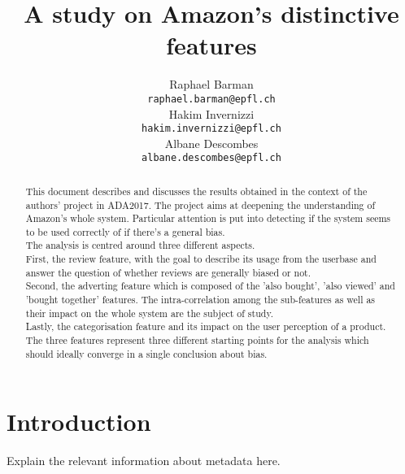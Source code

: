 \documentclass[11pt]{article}
\title{A study on Amazon's distinctive features}
\author{Raphael Barman \\
  {\tt raphael.barman@epfl.ch} \\\And
  Hakim Invernizzi \\
  {\tt hakim.invernizzi@epfl.ch} \\\And
Albane Descombes \\
{\tt albane.descombes@epfl.ch} \\}
\date{}
\begin{document}
\maketitle
\begin{abstract}
  This document describes and discusses the results obtained in the context of the authors' project in ADA2017. The project aims at deepening the understanding 
  of Amazon's whole system. Particular attention is put into detecting if the system seems to be used correctly of if there's a general bias. \\
  The analysis is centred around three different aspects. \\ First, the review feature, with the goal to describe its usage from the userbase and answer the question of whether reviews are generally biased or not. \\ Second, the adverting feature which is composed of the 'also bought', 'also viewed' and 'bought together' features. The intra-correlation among the sub-features as well as their impact on the whole system are the subject of study. \\ Lastly, the categorisation feature and its impact on the user perception of a product. \\  The three features represent three different starting points for the analysis which should ideally converge in a single conclusion about bias.
\end{abstract}


\section{Introduction}
  Explain the relevant information about metadata here.
  
\end{document}

